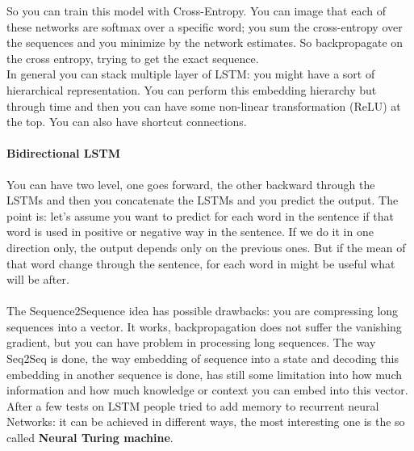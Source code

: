 
So you can train this model with Cross-Entropy. You can image that each of these networks are softmax over a specific word; you sum the cross-entropy over the sequences and you minimize by the network estimates. So  backpropagate on the cross entropy, trying to get the exact sequence. \\

In general you can stack multiple layer of LSTM: you might have a sort of hierarchical representation. You can perform this embedding hierarchy but through time and then you can have some non-linear transformation (ReLU) at the top. You can also have shortcut connections.\\ 

\paragraph{Bidirectional LSTM}
You can have two level, one goes forward, the other backward through the LSTMs and then you concatenate the LSTMs and you predict the output. The point is: let's assume you want to predict for each word in the sentence if that word is used in positive or negative way in the sentence. If we do it in one direction only, the output depends only on the previous ones. But if the mean of that word change through the sentence, for each word in might be useful what will be after. \\ \\ 

The Sequence2Sequence idea has possible drawbacks: you are compressing long sequences into a vector. It works, backpropagation does not suffer the vanishing gradient, but you can have problem in processing long sequences. The way Seq2Seq is done, the way embedding of sequence into a state and decoding this embedding in another sequence is done, has still some limitation into how much information and how much knowledge or context you can embed into this vector.\\
After a few tests on LSTM people tried to add memory to recurrent neural Networks: it can be achieved in different ways, the most interesting one is the so called \textbf{Neural Turing machine}.

